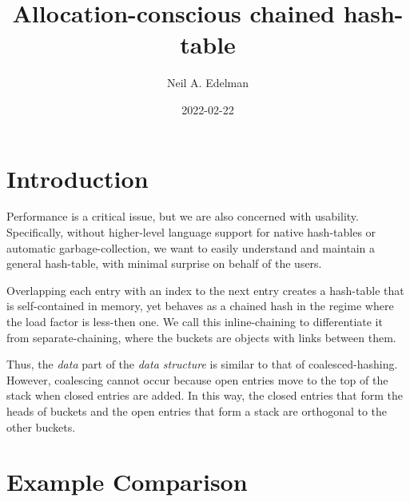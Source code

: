 \documentclass[12pt]{article}
\author{Neil A. Edelman}
\title{Allocation-conscious chained hash-table}
\date{2022-02-22}
\begin{document}
\maketitle


\section{Introduction}

Performance is a critical issue, but we are also concerned with usability. Specifically, without higher-level language support for native hash-tables or automatic garbage-collection, we want to easily understand and maintain a general hash-table, with minimal surprise on behalf of the users.

Overlapping each entry with an index to the next entry creates a hash-table that is self-contained in memory, yet behaves as a chained hash in the regime where the load factor is less-then one.\cite{knuth1998sorting} We call this inline-chaining to differentiate it from separate-chaining, where the buckets are objects with links between them.

Thus, the {\it data} part of the {\it data structure} is similar to that of coalesced-hashing\cite{williams1959handling}. However, coalescing cannot occur because open entries move to the top of the stack when closed entries are added. In this way, the closed entries that form the heads of buckets and the open entries that form a stack are orthogonal to the other buckets.

\section{Example Comparison}
\end{document}
